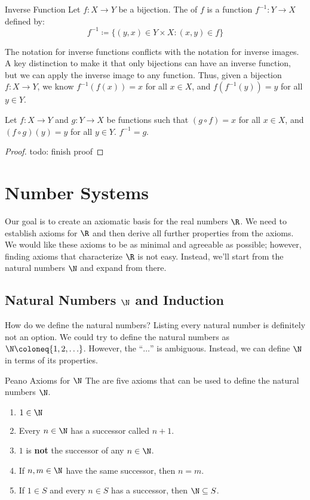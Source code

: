 \documentclass[12pt]{report}
\begin{document}
\begin{dfnbox}{Inverse Function}{}
    Let $f : X \to Y$ be a bijection. The  of $f$ is a function $f^{-1} : Y \to X$ defined by:
    \[ f^{-1} \coloneq \{ (y,x) \in Y \times X : (x,y) \in f \} \]
\end{dfnbox}

The notation for inverse functions conflicts with the notation for inverse images. A key distinction to make it that only bijections can have an inverse function, but we can apply the inverse image to any function. Thus, given a bijection $f : X \to Y$, we know $f^{-1}(f(x)) = x$ for all $x \in X$, and $f(f^{-1}(y)) = y$ for all $y \in Y$.

\begin{exbox}{}{}
    Let $f : X \to Y$ and $g : Y \to X$ be functions such that $(g \circ f) = x$ for all $x \in X$, and $(f \circ g)(y) = y$ for all $y \in Y$. $f^{-1} = g$.
    \tcblower
    \begin{proof}
        todo: finish proof
    \end{proof}
\end{exbox}

\chapter{Number Systems}
Our goal is to create an axiomatic basis for the real numbers $\R$. We need to establish axioms for $\R$ and then derive all further properties from the axioms. We would like these axioms to be as minimal and agreeable as possible; however, finding axioms that characterize $\R$ is not easy. Instead, we'll start from the natural numbers $\N$ and expand from there.

\section{Natural Numbers $\N$ and Induction}
How do we define the natural numbers? Listing every natural number is definitely not an option. We could try to define the natural numbers as $\N \coloneq \{ 1, 2, \ldots \}$. However, the ``$\ldots$'' is ambiguous. Instead, we can define $\N$ in terms of its properties.

\begin{dfnbox}{Peano Axioms for $\N$}{}
    The  are five axioms that can be used to define the natural numbers $\N$.
    \begin{enumerate}[noitemsep]
        \item $1 \in \N$
        \item Every $n \in \N$ has a successor called $n+1$.
        \item $1$ is \textbf{not} the successor of any $n \in \N$.
        \item If $n,m \in \N$ have the same successor, then $n = m$.
        \item If $1 \in S$ and every $n \in S$ has a successor, then $\N \subseteq S$.
    \end{enumerate}
\end{dfnbox}
\end{document}
